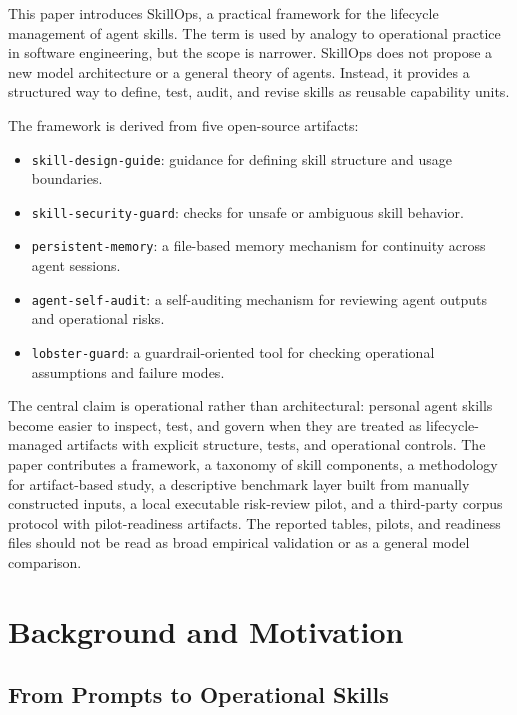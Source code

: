 \documentclass[11pt]{article}
\begin{document}
This paper introduces SkillOps, a practical framework for the lifecycle
management of agent skills. The term is used by analogy to operational practice
in software engineering, but the scope is narrower. SkillOps does not propose a
new model architecture or a general theory of agents. Instead, it provides a
structured way to define, test, audit, and revise skills as reusable capability
units.

The framework is derived from five open-source artifacts:

\begin{itemize}[leftmargin=*]
    \item \texttt{skill-design-guide}: guidance for defining skill structure
    and usage boundaries.
    \item \texttt{skill-security-guard}: checks for unsafe or ambiguous skill
    behavior.
    \item \texttt{persistent-memory}: a file-based memory mechanism for
    continuity across agent sessions.
    \item \texttt{agent-self-audit}: a self-auditing mechanism for reviewing
    agent outputs and operational risks.
    \item \texttt{lobster-guard}: a guardrail-oriented tool for checking
    operational assumptions and failure modes.
\end{itemize}

The central claim is operational rather than architectural: personal agent
skills become easier to inspect, test, and govern when they are treated as
lifecycle-managed artifacts with explicit structure, tests, and operational
controls. The paper contributes a framework, a taxonomy of skill components, a
methodology for artifact-based study, a descriptive benchmark layer built from
manually constructed inputs, a local executable risk-review pilot, and a
third-party corpus protocol with pilot-readiness artifacts. The reported
tables, pilots, and readiness files should not be read as broad empirical
validation or as a general model comparison.

\section{Background and Motivation}

\subsection{From Prompts to Operational Skills}
\end{document}
